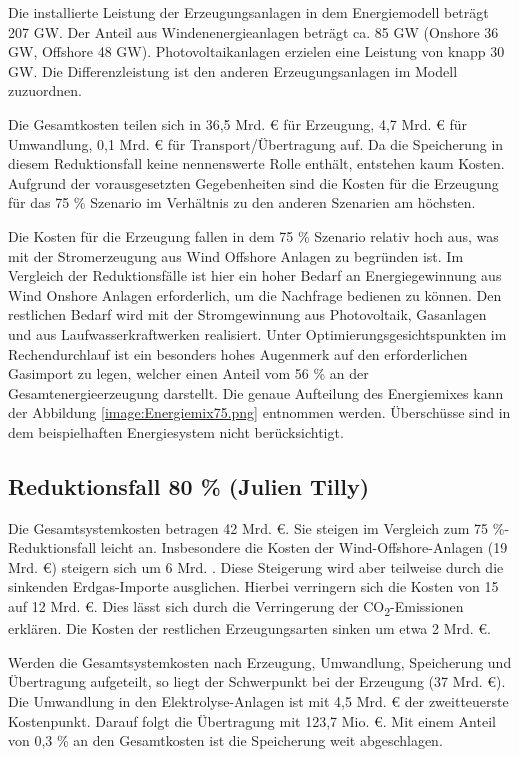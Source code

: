 Die installierte Leistung der Erzeugungsanlagen in dem Energiemodell beträgt 207 GW. Der Anteil aus Windenenergieanlagen beträgt ca. 85 GW (Onshore 36 GW, Offshore 48 GW). Photovoltaikanlagen erzielen eine Leistung von knapp 30 GW. Die Differenzleistung ist den anderen Erzeugungsanlagen im Modell zuzuordnen. 

Die Gesamtkosten teilen sich in 36,5 Mrd. € für Erzeugung, 4,7 Mrd. € für Umwandlung, 0,1 Mrd. € für Transport/Übertragung auf. Da die Speicherung in diesem Reduktionsfall keine nennenswerte Rolle enthält, entstehen kaum Kosten. Aufgrund der vorausgesetzten Gegebenheiten sind die Kosten für die Erzeugung für das 75 \% Szenario im Verhältnis zu den anderen Szenarien am höchsten. 

Die Kosten für die Erzeugung fallen in dem 75 \% Szenario relativ hoch aus, was mit der Stromerzeugung aus Wind Offshore Anlagen zu begründen ist. Im Vergleich der Reduktionsfälle ist hier ein hoher Bedarf an Energiegewinnung aus Wind Onshore Anlagen erforderlich, um die Nachfrage bedienen zu können. Den restlichen Bedarf wird mit der Stromgewinnung aus Photovoltaik, Gasanlagen und aus Laufwasserkraftwerken realisiert. Unter Optimierungsgesichtspunkten im Rechendurchlauf ist ein besonders hohes Augenmerk auf den erforderlichen Gasimport zu legen, welcher einen Anteil vom 56 \% an der Gesamtenergieerzeugung darstellt. Die genaue Aufteilung des Energiemixes kann der Abbildung \ref{image:Energiemix75.png} entnommen werden. Überschüsse sind in dem beispielhaften Energiesystem nicht berücksichtigt.
 


\newpage
\subsection{Reduktionsfall 80 \% (Julien Tilly)}
Die Gesamtsystemkosten betragen 42 Mrd. €. Sie steigen im Vergleich zum 75 \%-Reduktionsfall leicht an. Insbesondere die Kosten der Wind-Offshore-Anlagen (19 Mrd. €) steigern sich um 6 Mrd. . Diese Steigerung wird aber teilweise durch die sinkenden Erdgas-Importe ausglichen. Hierbei verringern sich die Kosten von 15 auf 12 Mrd. €. Dies lässt sich durch die Verringerung der CO\textsubscript{2}-Emissionen erklären. Die Kosten der restlichen Erzeugungsarten sinken um etwa 2 Mrd. €.

Werden die Gesamtsystemkosten nach Erzeugung, Umwandlung, Speicherung und Über\-tragung aufgeteilt, so liegt der Schwerpunkt bei der Erzeugung (37 Mrd. €). Die Umwandlung in den Elektrolyse-Anlagen ist mit 4,5 Mrd. € der zweitteuerste Kostenpunkt. Darauf folgt die Übertragung mit 123,7 Mio. €. Mit einem Anteil von 0,3 \% an den Gesamtkosten ist die Speicherung weit abgeschlagen.

